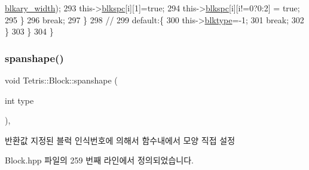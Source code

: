 \begin{DoxyCode}
      \hyperlink{class_tetris_1_1_block_a96548cab58eb788af744b54192c7bea1}{blkary\_width});
293                             this->\hyperlink{class_tetris_1_1_block_af2f96c83a3511d32321672f794aa4db1}{blkspc}[i][1]=\textcolor{keyword}{true};
294                             this->\hyperlink{class_tetris_1_1_block_af2f96c83a3511d32321672f794aa4db1}{blkspc}[i][i!=0?0:2] = \textcolor{keyword}{true};
295                         \}
296                         \textcolor{keywordflow}{break};
297                     \}
298                     \textcolor{comment}{//}
299                     \textcolor{keywordflow}{default}:\{
300                         this->\hyperlink{class_tetris_1_1_block_aceac58dcf8d8afaa82c2bab101cb3cff}{blktype}=-1;
301                         \textcolor{keywordflow}{break};
302                     \}
303                 \}
304             \}
\end{DoxyCode}
\mbox{\label{class_tetris_1_1_block_ad683f161157c16b80d5df8929bca468c}} 
\subsubsection{\texorpdfstring{spanshape()}{spanshape()}\hspace{0.1cm}{\footnotesize\ttfamily [2/2]}}
{\footnotesize\ttfamily void Tetris\+::\+Block\+::spanshape (\begin{DoxyParamCaption}\item[{int}]{type }\end{DoxyParamCaption})\hspace{0.3cm}{\ttfamily [inline]}, {\ttfamily [private]}}

\begin{DoxyReturn}{반환값}
지정된 블럭 인식번호에 의해서 함수내에서 모양 직접 설정 
\end{DoxyReturn}


Block.\+hpp 파일의 259 번째 라인에서 정의되었습니다.


